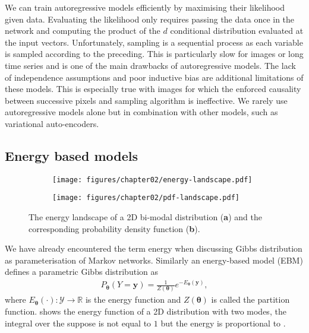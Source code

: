 We can train autoregressive models efficiently by maximising their likelihood given data. Evaluating the likelihood only requires passing the data once in the network and computing the product of the $d$ conditional distribution evaluated at the input vectors. Unfortunately, sampling is a sequential process as each variable is sampled according to the preceding. This is particularly slow for images or long time series and is one of the main drawbacks of autoregressive models. The lack of independence assumptions and poor inductive bias are additional limitations of these models. This is especially true with images for which the enforced causality between successive pixels and sampling algorithm is ineffective. We rarely use autoregressive models alone but in combination with other models, such as variational auto-encoders.

\subsection{Energy based models}
\begin{figure*}
  \centering
  \begin{subfigure}{.48\textwidth}
    \centering
    \texttt{[image: figures/chapter02/energy-landscape.pdf]}
    \caption{}
    \label{fig:Energy}
  \end{subfigure}
  \begin{subfigure}{.48\textwidth}
    \centering
    \texttt{[image: figures/chapter02/pdf-landscape.pdf]}
    \caption{}
    \label{fig:pdf}
  \end{subfigure}
  \caption{The energy landscape of a 2D bi-modal distribution (\textbf{a}) and the corresponding probability density function (\textbf{b}).}
\end{figure*}
We have already encountered the term energy when discussing Gibbs distribution as parameterisation of Markov networks. Similarly an energy-based model (EBM) defines a parametric Gibbs distribution as
\begin{align}
  P_{\bm{\theta}}(Y=\bm{y}) = \frac{1}{Z(\bm{\theta})} e^{-E_{\bm{\theta}}(\bm{y})},
\end{align}
where $E_{\bm{\theta}}(\cdot): \mathcal{Y}\rightarrow \mathbb{R}$ is the energy function and $Z(\bm{\theta})$ is called the partition function.  shows the energy function of a 2D distribution with two modes, the integral over the suppose is not equal to $1$ but the energy is proportional to .

